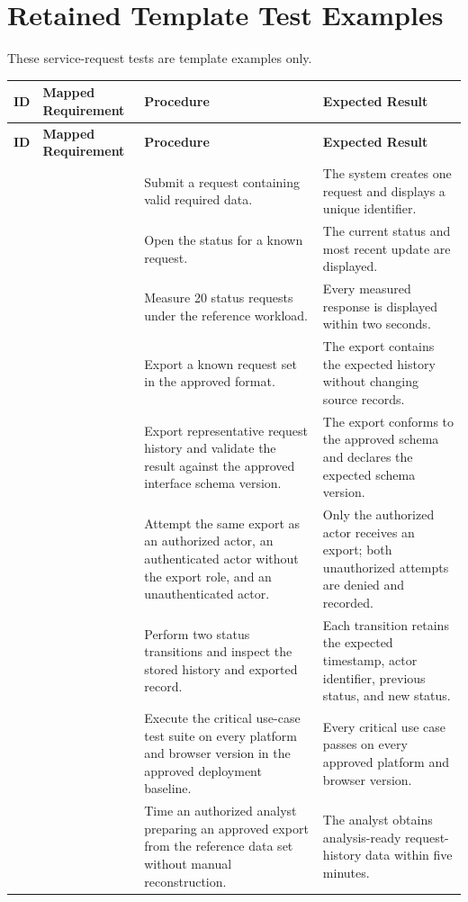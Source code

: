 \section{Retained Template Test Examples}
These service-request tests are template examples only.

\begin{tabularx}{\linewidth}{L{2.1cm}L{3.0cm}YL{5.0cm}}
\caption{Test Case Examples\label{Table:TestCaseExamples}}\\
\toprule
\textbf{ID} & \textbf{Mapped Requirement} & \textbf{Procedure} & \textbf{Expected Result}\\
\midrule
\endfirsthead
\toprule
\textbf{ID} & \textbf{Mapped Requirement} & \textbf{Procedure} & \textbf{Expected Result}\\
\midrule
\endhead
{} &  & Submit a request containing valid required data. & The system creates one request and displays a unique identifier.\\
 &  & Open the status for a known request. & The current status and most recent update are displayed.\\
 &  & Measure 20 status requests under the reference workload. & Every measured response is displayed within two seconds.\\
 &  & Export a known request set in the approved format. & The export contains the expected history without changing source records.\\
 &  & Export representative request history and validate the result against the approved interface schema version. & The export conforms to the approved schema and declares the expected schema version.\\
 &  & Attempt the same export as an authorized actor, an authenticated actor without the export role, and an unauthenticated actor. & Only the authorized actor receives an export; both unauthorized attempts are denied and recorded.\\
 &  & Perform two status transitions and inspect the stored history and exported record. & Each transition retains the expected timestamp, actor identifier, previous status, and new status.\\
 &  & Execute the critical use-case test suite on every platform and browser version in the approved deployment baseline. & Every critical use case passes on every approved platform and browser version.\\
 &  & Time an authorized analyst preparing an approved export from the reference data set without manual reconstruction. & The analyst obtains analysis-ready request-history data within five minutes.\\
\bottomrule
\end{tabularx}
